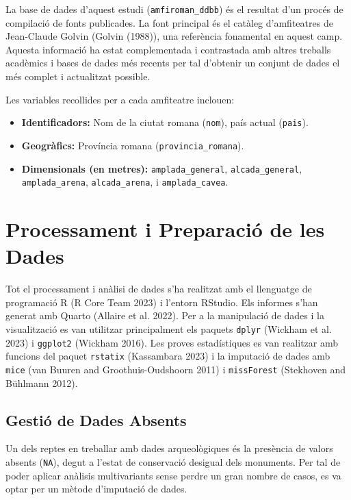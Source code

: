 \documentclass[
  12pt,
  letterpaper,
  DIV=11,
  numbers=noendperiod]{scrreprt}
\providecommand{\tightlist}{%
  \setlength{\itemsep}{0pt}\setlength{\parskip}{0pt}}
\begin{document}
La base de dades d'aquest estudi (\texttt{amfiroman\_ddbb}) és el
resultat d'un procés de compilació de fonts publicades. La font
principal és el catàleg d'amfiteatres de Jean-Claude Golvin (Golvin
(1988)), una referència fonamental en aquest camp. Aquesta informació ha
estat complementada i contrastada amb altres treballs acadèmics i bases
de dades més recents per tal d'obtenir un conjunt de dades el més
complet i actualitzat possible.

Les variables recollides per a cada amfiteatre inclouen:

\begin{itemize}
\tightlist
\item
  \textbf{Identificadors:} Nom de la ciutat romana (\texttt{nom}), país
  actual (\texttt{pais}).
\item
  \textbf{Geogràfics:} Província romana (\texttt{provincia\_romana}).
\item
  \textbf{Dimensionals (en metres):} \texttt{amplada\_general},
  \texttt{alcada\_general}, \texttt{amplada\_arena},
  \texttt{alcada\_arena}, i \texttt{amplada\_cavea}.
\end{itemize}

\section{Processament i Preparació de les
Dades}\label{processament-i-preparaciuxf3-de-les-dades}

Tot el processament i anàlisi de dades s'ha realitzat amb el llenguatge
de programació R (R Core Team 2023) i l'entorn RStudio. Els informes
s'han generat amb Quarto (Allaire et al. 2022). Per a la manipulació de
dades i la visualització es van utilitzar principalment els paquets
\texttt{dplyr} (Wickham et al. 2023) i \texttt{ggplot2} (Wickham 2016).
Les proves estadístiques es van realitzar amb funcions del paquet
\texttt{rstatix} (Kassambara 2023) i la imputació de dades amb
\texttt{mice} (van Buuren and Groothuis-Oudshoorn 2011) i
\texttt{missForest} (Stekhoven and Bühlmann 2012).

\subsection{Gestió de Dades Absents}\label{gestiuxf3-de-dades-absents}

Un dels reptes en treballar amb dades arqueològiques és la presència de
valors absents (\texttt{NA}), degut a l'estat de conservació desigual
dels monuments. Per tal de poder aplicar anàlisis multivariants sense
perdre un gran nombre de casos, es va optar per un mètode d'imputació de
dades.
\end{document}
